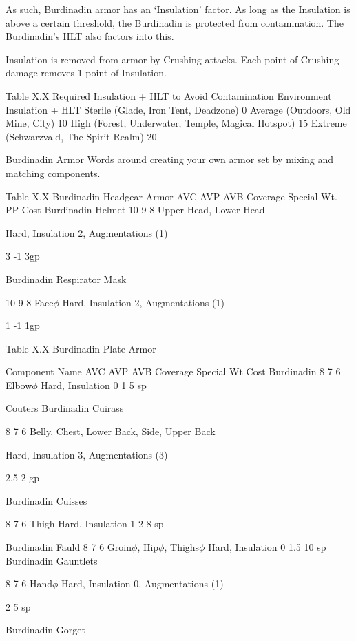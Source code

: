 \documentclass[oneside,11pt,english]{book}
\begin{document}
 

As such, Burdinadin armor has an ‘Insulation’ factor. As long as the Insulation is above a certain 
threshold, the Burdinadin is protected from contamination. The Burdinadin’s HLT also factors into this. 

 

Insulation is removed from armor by Crushing attacks. Each point of Crushing damage removes 1 point 
of Insulation. 

 
Table X.X Required Insulation + HLT to Avoid Contamination 
Environment Insulation + HLT 
Sterile (Glade, Iron Tent, Deadzone) 0 
Average (Outdoors, Old Mine, City) 10 
High (Forest, Underwater, Temple, Magical Hotspot) 15 
Extreme (Schwarzvald, The Spirit Realm) 20 

 

 

Burdinadin Armor 
Words around creating your own armor set by mixing and matching components. 

 

Table X.X Burdinadin Headgear 
Armor AVC AVP AVB Coverage Special Wt. PP Cost 
Burdinadin Helmet 10 9 8 Upper Head, 
Lower Head 

Hard, Insulation 2, 
Augmentations (1) 

3 -1 3gp 

Burdinadin 
Respirator Mask 

10 9 8 Face$\phi$ Hard, Insulation 2, 
Augmentations (1) 

1 -1 1gp 

 
Table X.X Burdinadin Plate Armor 

 

Component Name AVC AVP AVB Coverage Special Wt Cost 
Burdinadin 8 7 6 Elbow$\phi$ Hard, Insulation 0 1 5 sp 


Couters 
Burdinadin 
Cuirass 

8 7 6 Belly, Chest, Lower Back, 
Side, Upper Back 

Hard, Insulation 3, Augmentations 
(3) 

2.5 2 gp 

Burdinadin 
Cuisses 

8 7 6 Thigh Hard, Insulation 1 2 8 sp 

Burdinadin Fauld 8 7 6 Groin$\phi$, Hip$\phi$, Thighs$\phi$ Hard, Insulation 0 1.5 10 
sp 
Burdinadin 
Gauntlets 

8 7 6 Hand$\phi$ Hard, Insulation 0, Augmentations 
(1) 

2 5 sp 

Burdinadin 
Gorget 
\end{document}
